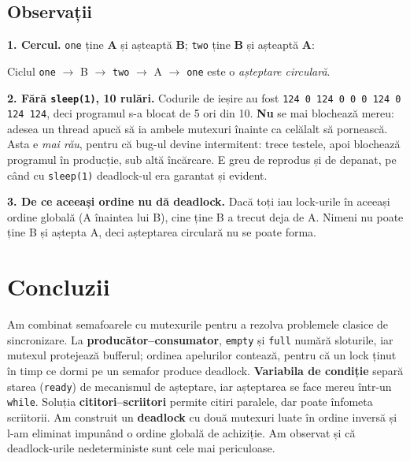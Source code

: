 \documentclass[11pt,a4paper]{article}
\begin{document}
\subsection*{Observații}
\begin{answer}
\textbf{1. Cercul.} \texttt{one} ține \textbf{A} și așteaptă \textbf{B}; \texttt{two} ține \textbf{B} și așteaptă
\textbf{A}:

\begin{center}
\end{center}
Ciclul \texttt{one} $\to$ B $\to$ \texttt{two} $\to$ A $\to$ \texttt{one} este o \emph{așteptare circulară}.

\medskip
\textbf{2. Fără \texttt{sleep(1)}, 10 rulări.} Codurile de ieșire au fost
\texttt{124 0 124 0 0 0 124 0 124 124}, deci programul s-a blocat de 5 ori din 10. \textbf{Nu} se mai blochează mereu:
adesea un thread apucă să ia ambele mutexuri înainte ca celălalt să pornească. Asta e \emph{mai rău}, pentru că bug-ul
devine intermitent: trece testele, apoi blochează programul în producție, sub altă încărcare. E greu de reprodus și de
depanat, pe când cu \texttt{sleep(1)} deadlock-ul era garantat și evident.

\medskip
\textbf{3. De ce aceeași ordine nu dă deadlock.} Dacă toți iau lock-urile în aceeași ordine globală (A înaintea lui B),
cine ține B a trecut deja de A. Nimeni nu poate ține B și aștepta A, deci așteptarea circulară nu se poate forma.
\end{answer}

\section*{Concluzii}
Am combinat semafoarele cu mutexurile pentru a rezolva problemele clasice de sincronizare. La
\textbf{producător--consumator}, \texttt{empty} și \texttt{full} numără sloturile, iar mutexul protejează bufferul;
ordinea apelurilor contează, pentru că un lock ținut în timp ce dormi pe un semafor produce deadlock. \textbf{Variabila de
condiție} separă starea (\texttt{ready}) de mecanismul de așteptare, iar așteptarea se face mereu într-un \texttt{while}.
Soluția \textbf{cititori--scriitori} permite citiri paralele, dar poate înfometa scriitorii. Am construit un
\textbf{deadlock} cu două mutexuri luate în ordine inversă și l-am eliminat impunând o ordine globală de achiziție. Am
observat și că deadlock-urile nedeterministe sunt cele mai periculoase.
\end{document}
